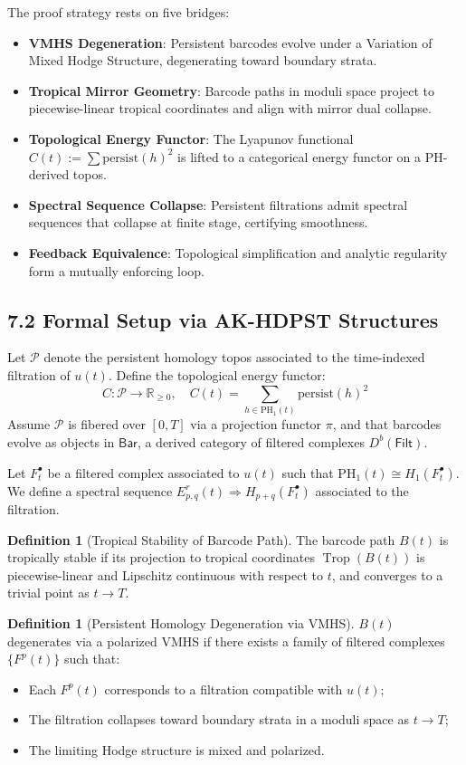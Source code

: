 \documentclass[11pt]{article}
\theoremstyle{definition}
\newtheorem{definition}[theorem]{Definition}
\begin{document}
The proof strategy rests on five bridges:
\begin{itemize}
    \item \textbf{VMHS Degeneration}: Persistent barcodes evolve under a Variation of Mixed Hodge Structure, degenerating toward boundary strata.
    \item \textbf{Tropical Mirror Geometry}: Barcode paths in moduli space project to piecewise-linear tropical coordinates and align with mirror dual collapse.
    \item \textbf{Topological Energy Functor}: The Lyapunov functional $C(t) := \sum \text{persist}(h)^2$ is lifted to a categorical energy functor on a PH-derived topos.
    \item \textbf{Spectral Sequence Collapse}: Persistent filtrations admit spectral sequences that collapse at finite stage, certifying smoothness.
    \item \textbf{Feedback Equivalence}: Topological simplification and analytic regularity form a mutually enforcing loop.
\end{itemize}

\subsection*{7.2 Formal Setup via AK-HDPST Structures}

Let $\mathcal{P}$ denote the persistent homology topos associated to the time-indexed filtration of $u(t)$. Define the topological energy functor:
\[
C: \mathcal{P} \to \mathbb{R}_{\geq 0}, \quad C(t) = \sum_{h \in \mathrm{PH}_1(t)} \text{persist}(h)^2
\]
Assume $\mathcal{P}$ is fibered over $[0,T]$ via a projection functor $\pi$, and that barcodes evolve as objects in $\mathsf{Bar}$, a derived category of filtered complexes $D^b(\mathsf{Filt})$.

Let $F^\bullet_t$ be a filtered complex associated to $u(t)$ such that $\mathrm{PH}_1(t) \cong H_1(F^\bullet_t)$. We define a spectral sequence $E^r_{p,q}(t) \Rightarrow H_{p+q}(F^\bullet_t)$ associated to the filtration.

\begin{definition}[Tropical Stability of Barcode Path]
The barcode path $B(t)$ is tropically stable if its projection to tropical coordinates $\operatorname{Trop}(B(t))$ is piecewise-linear and Lipschitz continuous with respect to $t$, and converges to a trivial point as $t \to T$.
\end{definition}

\begin{definition}[Persistent Homology Degeneration via VMHS]
$B(t)$ degenerates via a polarized VMHS if there exists a family of filtered complexes $\{F^p(t)\}$ such that:
\begin{itemize}
  \item Each $F^p(t)$ corresponds to a filtration compatible with $u(t)$;
  \item The filtration collapses toward boundary strata in a moduli space as $t \to T$;
  \item The limiting Hodge structure is mixed and polarized.
\end{itemize}
\end{definition}
\end{document}
